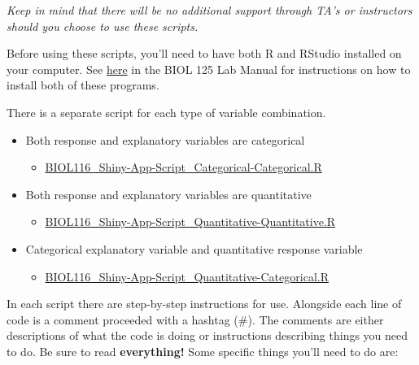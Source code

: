 \documentclass[
]{book}
\providecommand{\tightlist}{%
  \setlength{\itemsep}{0pt}\setlength{\parskip}{0pt}}
\begin{document}
\emph{Keep in mind that there will be no additional support through TA's or instructors should you choose to use these scripts.}

Before using these scripts, you'll need to have both R and RStudio installed on your computer. See \href{https://ubco-biology.github.io/BIOL-125-Lab-Manual/rmarkdown-and-rstudio.html}{here} in the BIOL 125 Lab Manual for instructions on how to install both of these programs.

There is a separate script for each type of variable combination.

\begin{itemize}
\tightlist
\item
  Both response and explanatory variables are categorical

  \begin{itemize}
  \tightlist
  \item
    \href{https://osf.io/download/pqjvx}{BIOL116\_Shiny-App-Script\_Categorical-Categorical.R}
  \end{itemize}
\item
  Both response and explanatory variables are quantitative

  \begin{itemize}
  \tightlist
  \item
    \href{https://osf.io/download/c285q}{BIOL116\_Shiny-App-Script\_Quantitative-Quantitative.R}
  \end{itemize}
\item
  Categorical explanatory variable and quantitative response variable

  \begin{itemize}
  \tightlist
  \item
    \href{https://osf.io/download/2npj5}{BIOL116\_Shiny-App-Script\_Quantitative-Categorical.R}
  \end{itemize}
\end{itemize}

In each script there are step-by-step instructions for use. Alongside each line of code is a comment proceeded with a hashtag (\#). The comments are either descriptions of what the code is doing or instructions describing things you need to do. Be sure to read \textbf{everything!}
Some specific things you'll need to do are:
\end{document}
